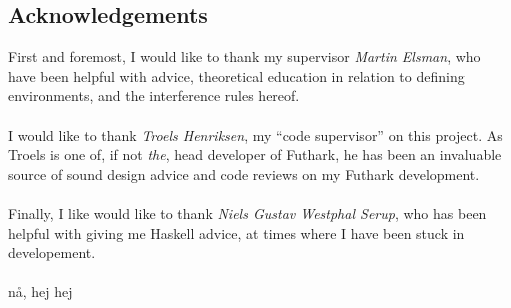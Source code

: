 \subsection{Acknowledgements}
\label{subsec:acknow}
First and foremost, I would like to thank my supervisor \textit{Martin Elsman}, who have
been helpful with advice, theoretical education in relation to defining
environments, and the interference rules hereof.
\\
\\
I would like to thank \textit{Troels Henriksen}, my ``code supervisor'' on this
project. As Troels is one of, if not \textit{the}, head developer of Futhark, he
has been an invaluable source of sound design advice and code reviews on my Futhark
development.
\\
\\
Finally, I like would like to thank \textit{Niels Gustav Westphal Serup}, who
has been helpful with giving me Haskell advice, at times where I have been stuck
in developement.
\\
\\
nå, hej hej
